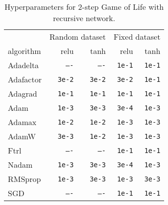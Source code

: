\documentclass[letterpaper]{article} %
\begin{document}
\begin{table}[h]
    \centering\small
    \begin{tabular}{lrrrr}
        \toprule
        & \multicolumn{2}{c}{Random dataset} & \multicolumn{2}{c}{Fixed dataset}
        \\\cmidrule(lr){2-3}\cmidrule(lr){4-5}
        algorithm & relu & tanh & relu & tanh
        \\\midrule
        Adadelta & \texttt{----} & \texttt{----} & \texttt{1e-1} & \texttt{1e-1}
        \\
        Adafactor & \texttt{3e-2} & \texttt{3e-2} & \texttt{3e-2} & \texttt{1e-1}
        \\
        Adagrad & \texttt{1e-1} & \texttt{1e-1} & \texttt{1e-1} & \texttt{1e-1}
        \\
        Adam & \texttt{1e-3} & \texttt{3e-3} & \texttt{3e-4} & \texttt{1e-3}
        \\
        Adamax & \texttt{1e-2} & \texttt{1e-2} & \texttt{1e-3} & \texttt{1e-3}
        \\
        AdamW & \texttt{3e-3} & \texttt{1e-2} & \texttt{1e-3} & \texttt{1e-3}
        \\
        Ftrl & \texttt{----} & \texttt{----} & \texttt{1e-1} & \texttt{1e-1}
        \\
        Nadam & \texttt{1e-3} & \texttt{3e-3} & \texttt{3e-4} & \texttt{1e-3}
        \\
        RMSprop & \texttt{1e-3} & \texttt{3e-3} & \texttt{1e-3} & \texttt{3e-3}
        \\
        SGD & \texttt{----} & \texttt{----} & \texttt{1e-1} & \texttt{1e-1}
        \\\bottomrule
    \end{tabular}
    \caption{Hyperparameters for 2-step Game of Life with recursive network.}
    \label{tab:search_2_step_rec}
\end{table}
\end{document}

